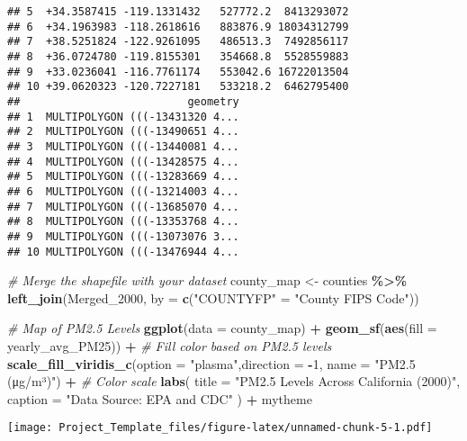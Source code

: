 \documentclass[
]{article}
\newenvironment{Shaded}{\begin{snugshade}}{\end{snugshade}}
\newcommand{\AttributeTok}[1]{\textcolor[rgb]{0.13,0.29,0.53}{#1}}
\newcommand{\CommentTok}[1]{\textcolor[rgb]{0.56,0.35,0.01}{\textit{#1}}}
\newcommand{\DecValTok}[1]{\textcolor[rgb]{0.00,0.00,0.81}{#1}}
\newcommand{\FunctionTok}[1]{\textcolor[rgb]{0.13,0.29,0.53}{\textbf{#1}}}
\newcommand{\NormalTok}[1]{#1}
\newcommand{\OtherTok}[1]{\textcolor[rgb]{0.56,0.35,0.01}{#1}}
\newcommand{\SpecialCharTok}[1]{\textcolor[rgb]{0.81,0.36,0.00}{\textbf{#1}}}
\newcommand{\StringTok}[1]{\textcolor[rgb]{0.31,0.60,0.02}{#1}}
\begin{document}
\begin{verbatim}
## 5  +34.3587415 -119.1331432   527772.2  8413293072
## 6  +34.1963983 -118.2618616   883876.9 18034312799
## 7  +38.5251824 -122.9261095   486513.3  7492856117
## 8  +36.0724780 -119.8155301   354668.8  5528559883
## 9  +33.0236041 -116.7761174   553042.6 16722013504
## 10 +39.0620323 -120.7227181   533218.2  6462795400
##                          geometry
## 1  MULTIPOLYGON (((-13431320 4...
## 2  MULTIPOLYGON (((-13490651 4...
## 3  MULTIPOLYGON (((-13440081 4...
## 4  MULTIPOLYGON (((-13428575 4...
## 5  MULTIPOLYGON (((-13283669 4...
## 6  MULTIPOLYGON (((-13214003 4...
## 7  MULTIPOLYGON (((-13685070 4...
## 8  MULTIPOLYGON (((-13353768 4...
## 9  MULTIPOLYGON (((-13073076 3...
## 10 MULTIPOLYGON (((-13476944 4...
\end{verbatim}

\begin{Shaded}
\begin{Highlighting}[]
\CommentTok{\# Merge the shapefile with your dataset}
\NormalTok{county\_map }\OtherTok{\textless{}{-}}\NormalTok{ counties }\SpecialCharTok{\%\textgreater{}\%}
  \FunctionTok{left\_join}\NormalTok{(Merged\_2000, }\AttributeTok{by =} \FunctionTok{c}\NormalTok{(}\StringTok{"COUNTYFP"} \OtherTok{=} \StringTok{"County FIPS Code"}\NormalTok{))}

\CommentTok{\# Map of PM2.5 Levels}
\FunctionTok{ggplot}\NormalTok{(}\AttributeTok{data =}\NormalTok{ county\_map) }\SpecialCharTok{+}
  \FunctionTok{geom\_sf}\NormalTok{(}\FunctionTok{aes}\NormalTok{(}\AttributeTok{fill =}\NormalTok{ yearly\_avg\_PM25)) }\SpecialCharTok{+}  \CommentTok{\# Fill color based on PM2.5 levels}
  \FunctionTok{scale\_fill\_viridis\_c}\NormalTok{(}\AttributeTok{option =} \StringTok{"plasma"}\NormalTok{,}\AttributeTok{direction =} \SpecialCharTok{{-}}\DecValTok{1}\NormalTok{, }\AttributeTok{name =} \StringTok{"PM2.5 (μg/m³)"}\NormalTok{) }\SpecialCharTok{+}  \CommentTok{\# Color scale}
  \FunctionTok{labs}\NormalTok{(}
    \AttributeTok{title =} \StringTok{"PM2.5 Levels Across California (2000)"}\NormalTok{,}
    \AttributeTok{caption =} \StringTok{"Data Source: EPA and CDC"}
\NormalTok{  ) }\SpecialCharTok{+}
\NormalTok{  mytheme}
\end{Highlighting}
\end{Shaded}

\texttt{[image: Project\_Template\_files/figure-latex/unnamed-chunk-5-1.pdf]}
\end{document}
